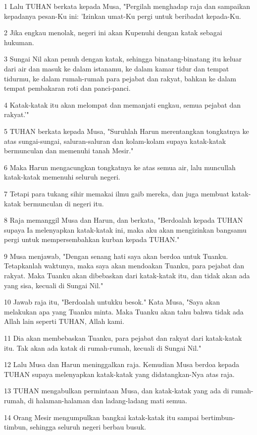 \par 1 Lalu TUHAN berkata kepada Musa, "Pergilah menghadap raja dan sampaikan kepadanya pesan-Ku ini: 'Izinkan umat-Ku pergi untuk beribadat kepada-Ku.
\par 2 Jika engkau menolak, negeri ini akan Kupenuhi dengan katak sebagai hukuman.
\par 3 Sungai Nil akan penuh dengan katak, sehingga binatang-binatang itu keluar dari air dan masuk ke dalam istanamu, ke dalam kamar tidur dan tempat tidurmu, ke dalam rumah-rumah para pejabat dan rakyat, bahkan ke dalam tempat pembakaran roti dan panci-panci.
\par 4 Katak-katak itu akan melompat dan memanjati engkau, semua pejabat dan rakyat.'"
\par 5 TUHAN berkata kepada Musa, "Suruhlah Harun merentangkan tongkatnya ke atas sungai-sungai, saluran-saluran dan kolam-kolam supaya katak-katak bermunculan dan memenuhi tanah Mesir."
\par 6 Maka Harun mengacungkan tongkatnya ke atas semua air, lalu muncullah katak-katak memenuhi seluruh negeri.
\par 7 Tetapi para tukang sihir memakai ilmu gaib mereka, dan juga membuat katak-katak bermunculan di negeri itu.
\par 8 Raja memanggil Musa dan Harun, dan berkata, "Berdoalah kepada TUHAN supaya Ia melenyapkan katak-katak ini, maka aku akan mengizinkan bangsamu pergi untuk mempersembahkan kurban kepada TUHAN."
\par 9 Musa menjawab, "Dengan senang hati saya akan berdoa untuk Tuanku. Tetapkanlah waktunya, maka saya akan mendoakan Tuanku, para pejabat dan rakyat. Maka Tuanku akan dibebaskan dari katak-katak itu, dan tidak akan ada yang sisa, kecuali di Sungai Nil."
\par 10 Jawab raja itu, "Berdoalah untukku besok." Kata Musa, "Saya akan melakukan apa yang Tuanku minta. Maka Tuanku akan tahu bahwa tidak ada Allah lain seperti TUHAN, Allah kami.
\par 11 Dia akan membebaskan Tuanku, para pejabat dan rakyat dari katak-katak itu. Tak akan ada katak di rumah-rumah, kecuali di Sungai Nil."
\par 12 Lalu Musa dan Harun meninggalkan raja. Kemudian Musa berdoa kepada TUHAN supaya melenyapkan katak-katak yang didatangkan-Nya atas raja.
\par 13 TUHAN mengabulkan permintaan Musa, dan katak-katak yang ada di rumah-rumah, di halaman-halaman dan ladang-ladang mati semua.
\par 14 Orang Mesir mengumpulkan bangkai katak-katak itu sampai bertimbun-timbun, sehingga seluruh negeri berbau busuk.
